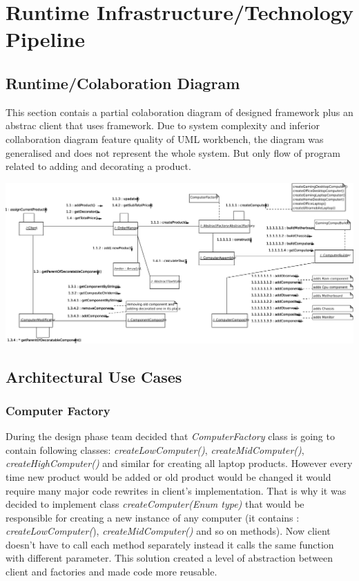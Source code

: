 \documentclass[pdftex,11pt,a4paper]{article}
\begin{document}
\pagebreak

\section{Runtime Infrastructure/Technology Pipeline}
\subsection{Runtime/Colaboration Diagram}
This section contais a partial colaboration diagram of designed framework plus an abstrac client that uses framework. Due to system complexity and inferior collaboration diagram feature quality of UML workbench, the diagram was generalised and does not represent the whole system. But only flow of program related to adding and decorating a product.

\begin{center}
	\includegraphics[scale=1, angle=90]{images/CollaborationDiagram.pdf}
\end{center}

\subsection{Architectural Use Cases}

\subsubsection{Computer Factory}
During the design phase team decided that \emph{ComputerFactory} class is going to contain following classes: \emph{createLowComputer()}, \emph{createMidComputer()}, \emph{createHighComputer()} and similar for creating all laptop products. However every time new product would be added or old product would be changed it would require many major code rewrites in client's implementation. That is why it was decided to implement class \emph{createComputer(Enum type)} that would be responsible for creating a new instance of any computer (it contains : \emph{createLowComputer(}), \emph{createMidComputer()} and so on methods). Now client doesn't have to call each method separately instead it calls the same function with different parameter. This solution created a level of abstraction between client and factories and made code more reusable.
\end{document}
